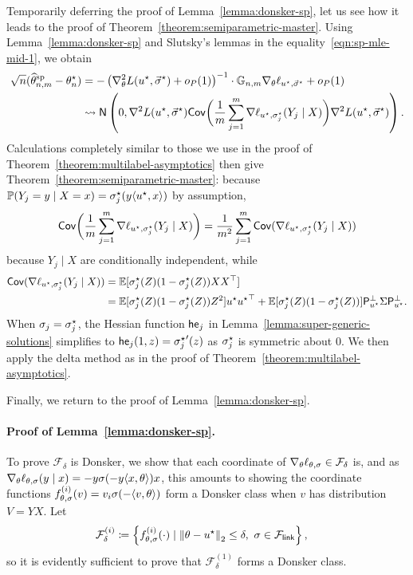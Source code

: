 Temporarily deferring the proof of Lemma~\ref{lemma:donsker-sp}, let us see
how it leads to the proof of Theorem~\ref{theorem:semiparametric-master}.
Using Lemma~\ref{lemma:donsker-sp} and Slutsky's lemmas in the
equality~\eqref{eqn:sp-mle-mid-1}, we obtain
\begin{align*}
	\sqrt{n}(\widehat{\theta}^{\textup{sp}}_{n,m} - \theta_n^\star)
	& = 
	-\left({\nabla_\theta^2 L(u^\star, \vec{\sigma}^\star)  + o_P(1)}\right)^{-1}
	\cdot \mathbb{G}_{n,m} \nabla_\theta \ell_{u^\star, \vec{\sigma}^\star}
	+ o_P(1) \\
	& \rightsquigarrow \mathsf{N}\left(0,
	\nabla^2 L(u^\star, \vec{\sigma}^\star)
	\mathsf{Cov}\bigg(\frac{1}{m}
	\sum_{j = 1}^m \nabla \ell_{u^\star, \sigma_j^\star}(Y_j \mid X)\bigg)
	\nabla^2 L(u^\star, \vec{\sigma}^\star)\right).
\end{align*}
Calculations completely similar to those we use in the proof of
Theorem~\ref{theorem:multilabel-asymptotics} then give
Theorem~\ref{theorem:semiparametric-master}: because $\mathbb{P}(Y_j = y \mid X = x)
= \sigma_j^\star(y \langle u^\star, x\rangle)$ by assumption,
\begin{equation*}
	\mathsf{Cov}\bigg(\frac{1}{m}
	\sum_{j = 1}^m \nabla \ell_{u^\star, \sigma_j^\star}(Y_j \mid X)\bigg)
	= \frac{1}{m^2} \sum_{j = 1}^m
	\mathsf{Cov}(\nabla \ell_{u^\star, \sigma_j^\star}(Y_j \mid X))
\end{equation*}
because
$Y_j \mid X$ are conditionally independent, while
\begin{align*}
	\mathsf{Cov}(\nabla \ell_{u^\star,\sigma_j^\star}(Y_j \mid X))
	& = \mathbb{E}[\sigma_j^\star(Z)(1 - \sigma_j^\star(Z)) XX^\top] \\
	& = \mathbb{E}[\sigma_j^\star(Z)(1 - \sigma_j^\star(Z)) Z^2]
	u^\star{u^\star}^\top
	+ \mathbb{E}[\sigma_j^\star(Z)(1 - \sigma_j^\star(Z))]
	\mathsf{P}_{u^\star}^\perp \Sigma \mathsf{P}_{u^\star}^\perp.
\end{align*}
When
$\sigma_j = \sigma_j^\star$, the Hessian function $\mathsf{he}_j$
in Lemma~\ref{lemma:super-generic-solutions}
simplifies to $\mathsf{he}_j(1, z) = {\sigma_j^\star}'(z)$ as
$\sigma_j^\star$ is symmetric about 0.
We then apply the delta method
as in the proof of Theorem~\ref{theorem:multilabel-asymptotics}.

Finally, we return to the proof of Lemma~\ref{lemma:donsker-sp}.

\paragraph{Proof of Lemma~\ref{lemma:donsker-sp}.}

\newcommand{\ball}{\mathbb{B}}
\newcommand{\Fflip}{\mc{F}_{\mathsf{flip}}}

To prove $\mathcal{F}_\delta$ is Donsker, we show that each coordinate of
$\nabla_{\theta} \ell_{\theta, \sigma} \in \mathcal{F}_\delta$ is, and as
$\nabla_\theta \ell_{\theta, \sigma} (y \mid x) = -y\sigma(-y\langle x,
\theta\rangle)x$, this amounts to showing the coordinate functions $f_{\theta,
	\sigma}^{(i)}(v) = v_i\sigma(-\langle v, \theta\rangle)$ form a Donsker class when
$v$ has distribution $V = YX$. Let
\begin{align*}
	\mathcal{F}_\delta^{(i)}
	& \coloneqq \left\{ f_{\theta, \sigma}^{(i)}(\cdot) \mid
	\left\|{\theta - u^\star}\right\|_2 \leq \delta, ~
	\sigma \in \mathcal{F}_{\mathsf{link}} \right\},
\end{align*}
so it is evidently sufficient to prove
that $\mathcal{F}_\delta^{(1)}$ forms a Donsker class.

